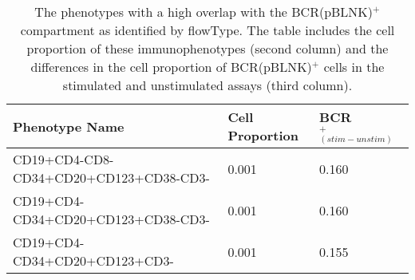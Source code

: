 \begin{table}[ht]\footnotesize
  \begin{center}
    \caption{The phenotypes with a high overlap with the BCR(pBLNK)$^+$ compartment as identified by flowType. The table includes the cell proportion of these immunophenotypes (second column) and the differences in the cell proportion of BCR(pBLNK)$^+$ cells in the stimulated and unstimulated assays (third column).}
    \label{apx:BCR}
    \begin{tabular}{lll}
      \hline
      Phenotype Name & Cell Proportion & BCR$^+_{(stim-unstim)}$ \\ 
      \hline
      CD19+CD4-CD8-CD34+CD20+CD123+CD38-CD3- & 0.001 & 0.160 \\ 
      CD19+CD4-CD34+CD20+CD123+CD38-CD3- & 0.001 & 0.160 \\ 
      CD19+CD4-CD34+CD20+CD123+CD3- & 0.001 & 0.155 \\ 
      \hline
    \end{tabular}
  \end{center}
\end{table}

